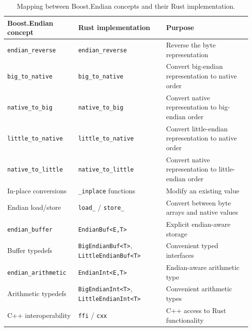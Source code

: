 \begin{table}[H]
    \centering
    \renewcommand{\arraystretch}{1.2}
    {\small
\begin{tabularx}{\textwidth}{|X|X|X|}
        \hline
        \textbf{Boost.Endian concept} &
        \textbf{Rust implementation} &
        \textbf{Purpose} \\
        \hline

        \texttt{endian\_reverse} &
        \texttt{endian\_reverse} &
        Reverse the byte representation \\
        \hline

        \texttt{big\_to\_native} &
        \texttt{big\_to\_native} &
        Convert big-endian representation to native order \\
        \hline

        \texttt{native\_to\_big} &
        \texttt{native\_to\_big} &
        Convert native representation to big-endian order \\
        \hline

        \texttt{little\_to\_native} &
        \texttt{little\_to\_native} &
        Convert little-endian representation to native order \\
        \hline

        \texttt{native\_to\_little} &
        \texttt{native\_to\_little} &
        Convert native representation to little-endian order \\
        \hline

        In-place conversions &
        \texttt{\*\_inplace} functions &
        Modify an existing value \\
        \hline

        Endian load/store &
        \texttt{load\_\*} / \texttt{store\_\*} &
        Convert between byte arrays and native values \\
        \hline

        \texttt{endian\_buffer} &
        \texttt{EndianBuf<E,T>} &
        Explicit endian-aware storage \\
        \hline

        Buffer typedefs &
        \texttt{BigEndianBuf<T>}, \texttt{LittleEndianBuf<T>} &
        Convenient typed interfaces \\
        \hline

        \texttt{endian\_arithmetic} &
        \texttt{EndianInt<E,T>} &
        Endian-aware arithmetic type \\
        \hline

        Arithmetic typedefs &
        \texttt{BigEndianInt<T>}, \texttt{LittleEndianInt<T>} &
        Convenient arithmetic types \\
        \hline

        C++ interoperability &
        \texttt{ffi} / \texttt{cxx} &
        C++ access to Rust functionality \\
        \hline

    \end{tabularx}
    }
    \caption{Mapping between Boost.Endian concepts and their Rust implementation.}
    \label{tab:boost-endian-rust-mapping}
\end{table}

